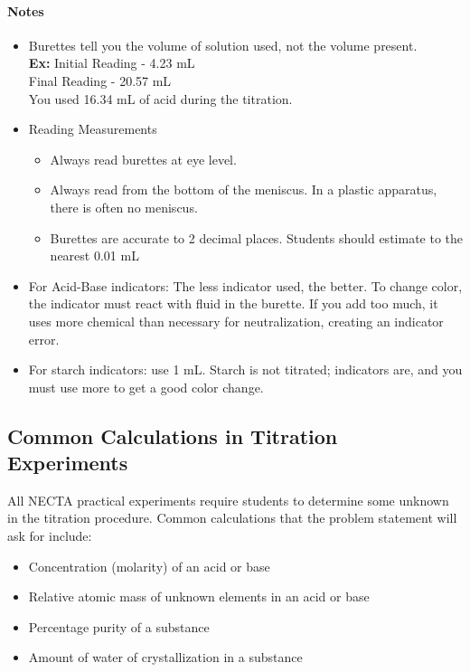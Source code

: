 \paragraph{Notes}
\begin{itemize}
\item Burettes tell you the volume of solution used, not the volume present.\\
\textbf{Ex:} Initial Reading - 4.23 mL\\
Final Reading - 20.57 mL\\
You used 16.34 mL of acid during the titration.

\item Reading Measurements
	\begin{itemize}[topsep=0ex,itemsep=0ex,partopsep=1ex,parsep=1ex]
	\item Always read burettes at eye level.
	\item Always read from the bottom of the meniscus. In a plastic apparatus, there is often no meniscus.
	\item Burettes are accurate to 2 decimal places. Students should estimate to the nearest 0.01 mL
	\end{itemize}

\item For Acid-Base indicators: The less indicator used, the better. To change color, the indicator must react with fluid in the burette. If you add too much, it uses more chemical than necessary for neutralization, creating an indicator error.
		
\item For starch indicators: use 1 mL. Starch is not titrated; indicators are, and you must use more to get a good color change.

\end{itemize}

\subsection{Common Calculations in Titration Experiments}
\label{sub:titcalc}

All NECTA practical experiments require students to determine some unknown in the titration procedure. Common calculations that the problem statement will ask for include:

\begin{itemize}[topsep=0ex,itemsep=0ex,partopsep=1ex,parsep=1ex]

\item{Concentration (molarity) of an acid or base}
\item{Relative atomic mass of unknown elements in an acid or base}
\item{Percentage purity of a substance}
\item{Amount of water of crystallization in a substance}

\end{itemize}

